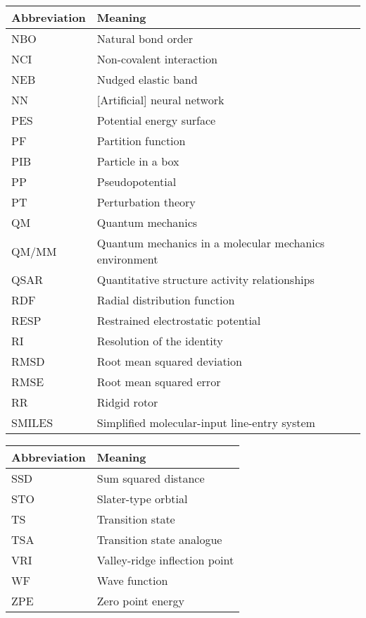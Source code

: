 \documentclass[../main.tex]{subfiles}
\begin{document}
\begin{table}[h!]
\def\arraystretch{2.0}
\begin{tabularx}{\textwidth}{YY}
Abbreviation & Meaning \\
\hline
NBO	&	Natural bond order	\\
NCI	&	Non-covalent interaction	\\
NEB	&	Nudged elastic band	\\
NN	&	[Artificial] neural network	\\
PES	&	Potential energy surface	\\
PF	&	Partition function	\\
PIB	&	Particle in a box	\\
PP	&	Pseudopotential	\\
PT	&	Perturbation theory	\\
QM	&	Quantum mechanics	\\
QM/MM	&	Quantum mechanics in a molecular mechanics environment	\\
QSAR	&	Quantitative structure activity relationships	\\
RDF	&	Radial distribution function	\\
RESP	&	Restrained electrostatic potential	\\
RI	&	Resolution of the identity	\\
RMSD	&	Root mean squared deviation	\\
RMSE	&	Root mean squared error	\\
RR	&	Ridgid rotor	\\
SMILES	&	Simplified molecular-input line-entry system	\\
\end{tabularx}
\end{table}
\newpage
\begin{table}[h!]
\def\arraystretch{2.0}
\begin{tabularx}{\textwidth}{YY}
Abbreviation & Meaning \\
\hline
SSD	&	Sum squared distance	\\
STO	&	Slater-type orbtial	\\
TS	&	Transition state	\\
TSA	&	Transition state analogue	\\
VRI	&	Valley-ridge inflection point	\\
WF	&	Wave function	\\
ZPE	&	Zero point energy	\\
\end{tabularx}
\end{table}
\clearpage
\end{document}
